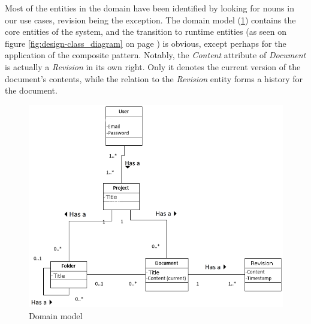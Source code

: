 Most of the entities in the \SOP{} domain have been identified by looking for nouns in our use cases, revision being the exception.
The domain model (\ref{fig:domain-model}) contains the core entities of the \SOP{} system, and the transition to runtime entities (as seen on figure \ref{fig:design-class_diagram} on page \pageref{fig:design-class_diagram}) is obvious, except perhaps for the application of the composite pattern.
Notably, the \emph{Content} attribute of \emph{Document} is actually a \emph{Revision} in 
its own right. Only it denotes the current version of the document's contents, while the relation to the \emph{Revision} entity forms a history for the document.
\begin{figure}[hbt]
	\centering
	\includegraphics[width=1\textwidth]{Software_analysis/graphics/Domain_model.png}
	\caption{Domain model}
	\label{fig:domain-model}
\end{figure}
	
